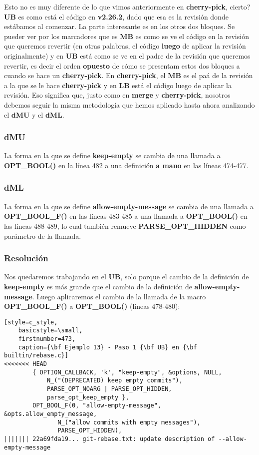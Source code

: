 Esto no es muy diferente de lo que vimos anteriormente en {\bf cherry-pick}, cierto? {\bf UB} es como está el
código en {\bf v2.26.2}, dado que esa es la revisión donde estábamos al comenzar. La parte interesante es en los otros
dos bloques. Se pueder ver por los marcadores que es {\bf MB} es como se ve el código en la revisión que queremos revertir
(en otras palabras, el código {\bf luego} de aplicar la revisión originalmente) y en {\bf UB} está como se ve en el padre
de la revisión que queremos revertir, es decir el orden {\bf opuesto} de cómo se presentam estos dos bloques a cuando se
hace un {\bf cherry-pick}. En {\bf cherry-pick}, el {\bf MB} es el paá de la revisión a la que se le hace {\bf cherry-pick}
y en {\bf LB} está el código luego de aplicar la revisión. Eso significa que, justo como en {\bf merge} y {\bf cherry-pick},
nosotros debemos seguir la misma metodología que hemos aplicado hasta ahora analizando el {\bf dMU} y el {\bf dML}.

\subsubsection{dMU}
La forma en la que se define {\bf keep-empty} se cambia de una llamada a {\bf OPT\_BOOL()} en la línea 482 a una definición
{\bf a mano} en las líneas 474-477.

\subsubsection{dML}
La forma en la que se define {\bf allow-empty-message} se cambia de una llamada a {\bf OPT\_BOOL\_F()} en las líneas 483-485 a
una llamada a {\bf OPT\_BOOL()} en las líneas 488-489, lo cual también remueve {\bf PARSE\_OPT\_HIDDEN} como parámetro de la
llamada.

\subsubsection{Resolución}
Nos quedaremos trabajando en el {\bf UB}, solo porque el cambio de la definición de {\bf keep-empty} es más grande que 
el cambio de la definición de {\bf allow-empty-message}. Luego aplicaremos el cambio de la llamada de la macro {\bf OPT\_BOOL\_F()}
a {\bf OPT\_BOOL()} (líneas 478-480):

\begin{lstlisting}[style=c_style,
	basicstyle=\small,
	firstnumber=473,
	caption={\bf Ejemplo 13} - Paso 1 {\bf UB} en {\bf builtin/rebase.c}]
<<<<<<< HEAD
		{ OPTION_CALLBACK, 'k', "keep-empty", &options, NULL,
			N_("(DEPRECATED) keep empty commits"),
			PARSE_OPT_NOARG | PARSE_OPT_HIDDEN,
			parse_opt_keep_empty },
		OPT_BOOL_F(0, "allow-empty-message", &opts.allow_empty_message,
			   N_("allow commits with empty messages"),
			   PARSE_OPT_HIDDEN),
||||||| 22a69fda19... git-rebase.txt: update description of --allow-empty-message
\end{lstlisting}

